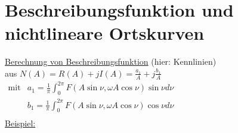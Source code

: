 \documentclass[openany,a4paper,11pt]{book}
\begin{document}
\section[Beschreibungsfunktion \& Ortskurven]{Beschreibungsfunktion und nichtlineare Ortskurven}
\uline{Berechnung von Beschreibungsfunktion} (hier: Kennlinien)\\
aus $N(A)=R(A)+jI(A)=\frac{a_1}{A}+j\frac{b_1}{A}$\\
$\begin{array}{cc}
\text{mit}& a_1=\frac{1}{\pi}\int_{0}^{2\pi}F(A\sin{\nu},\omega A\cos{\nu})\sin{\nu}d\nu\\
& b_1=\frac{1}{\pi}\int_{0}^{2\pi}F(A\sin{\nu},\omega A\cos{\nu})\cos{\nu}d\nu\\
\end{array}$\\
\uline{Beispiel:} 
\end{document}
